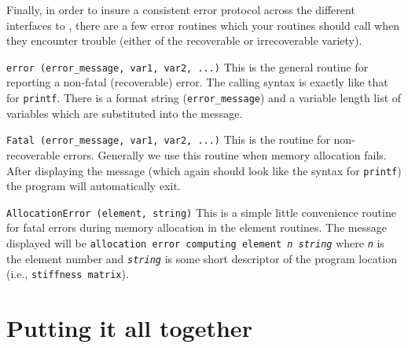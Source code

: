 Finally, in order to insure a consistent error protocol across the
different interfaces to \felt{}, there are a few error routines which
your routines should call when they encounter trouble (either of 
the recoverable or irrecoverable variety).

\begin{dispitems}
\item [\tt error (error\_message, var1, var2, ...)]
 This is the general routine for reporting a non-fatal (recoverable) error.
 The calling syntax is exactly like that for {\tt printf}.  There is a format
 string ({\tt error\_message}) and a variable length list of variables which
 are substituted into the message.

\item [\tt Fatal (error\_message, var1, var2, ...)]
 This is the routine for non-recoverable errors.  Generally we use this
 routine when memory allocation fails.  After displaying the message
 (which again should look like the syntax for {\tt printf}) the
 program will automatically exit.

\item [\tt AllocationError (element, string)]
 This is a simple little convenience routine for fatal errors during
 memory allocation in the element routines.  The message displayed will
 be {\tt allocation error computing element {\em n string}}
 where {\tt {\em n}} is the element number and {\tt {\em string}} is some
 short descriptor of the program location (i.e., {\tt stiffness matrix}).
\end{dispitems}

\section{Putting it all together}

